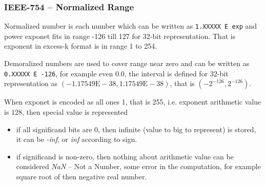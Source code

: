 \documentclass{beamer}
\begin{document}
\begin{frame}
\frametitle{IEEE-754 -- Normalized Range}

Normalized number is each number which can be written as \texttt{1.XXXXX E exp} and power exponet fits in range -126 till 127 for 32-bit representation. That is exponent in excess-k format is in range 1 to 254.

\bigskip
Demoralized numbers are used to cover range near zero and can be written as \texttt{0.XXXXX E -126}, for example even 0.0, the interval is defined for 32-bit representation as $(-1.17549\text{E}-38,1.17549\text{E}-38)$, that is $(-2^{-126},2^{-126})$.

\bigskip
When exponet is encoded as all ones 1, that is 255, i.e. exponent arithmetic value is 128, then special value is represented 
\begin{itemize}
\item if all significand bits are 0, then infinite (value to big to represent) is stored, it can be \textit{-inf}, or \textit{inf} according to sign.
\item if significand is non-zero, then nothing about arithmetic value can be considered \textit{NaN} -- Not a Number, some error in the computation, for example square root of then negative real number.
\end{itemize}
\end{frame}
\end{document}
